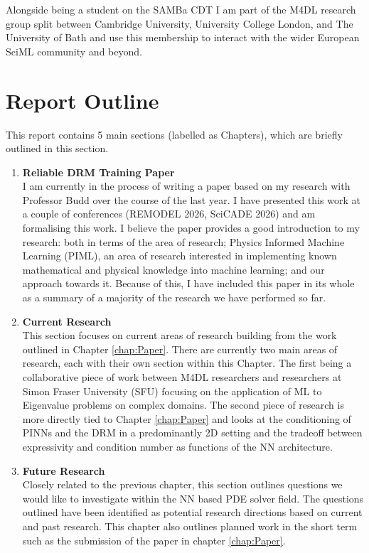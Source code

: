 \documentclass[11pt, onecolumn]{report}
\begin{document}
Alongside being a student on the SAMBa CDT I am part of the M4DL research group split between Cambridge University, University College London, and The University of Bath and use this membership to interact with the wider European SciML community and beyond.


\section{Report Outline}
\label{sec:ReportOutline}
This report contains 5 main sections (labelled as Chapters), which are briefly outlined in this section.

\begin{enumerate}
	\item \textbf{Reliable DRM Training Paper} \\ 
	I am currently in the process of writing a paper based on my research with Professor Budd over the course of the last year. I have presented this work at a couple of conferences (REMODEL 2026, SciCADE 2026) and am formalising this work. I believe the paper provides a good introduction to my research: both in terms of the area of research; Physics Informed Machine Learning (PIML), an area of research interested in implementing known mathematical and physical knowledge into machine learning; and our approach towards it. Because of this, I have included this paper in its whole as a summary of a majority of the research we have performed so far.
	\item \textbf{Current Research} \\
	This section focuses on current areas of research building from the work outlined in Chapter \ref{chap:Paper}. There are currently two main areas of research, each with their own section within this Chapter. 
	The first being a collaborative piece of work between M4DL researchers and researchers at Simon Fraser University (SFU) focusing on the application of ML to Eigenvalue problems on complex domains. 
	The second piece of research is more directly tied to Chapter \ref{chap:Paper} and looks at the conditioning of PINNs and the DRM in a predominantly 2D setting and the tradeoff between expressivity and condition number as functions of the NN architecture. 
	\item \textbf{Future Research} \\
	Closely related to the previous chapter, this section outlines questions we would like to investigate within the NN based PDE solver field. The questions outlined have been identified as potential research directions based on current and past research. This chapter also outlines planned work in the short term such as the submission of the paper in chapter \ref{chap:Paper}.

\end{enumerate}
\end{document}
